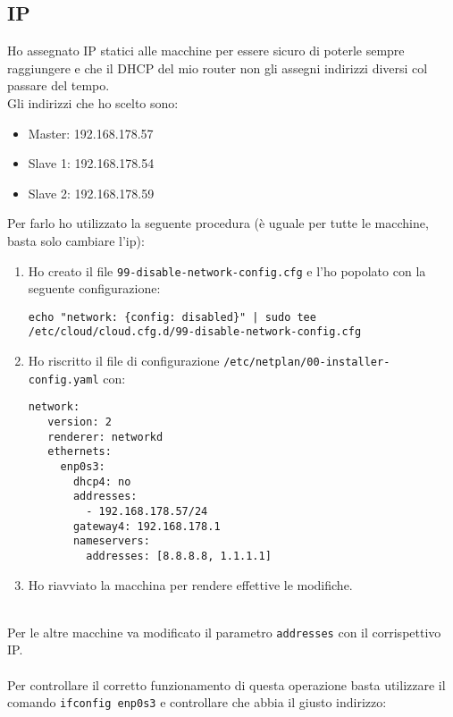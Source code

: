 \subsection{IP}

Ho assegnato IP statici alle macchine per essere sicuro di poterle sempre raggiungere e che
il DHCP del mio router non gli assegni indirizzi diversi col passare del tempo.\\
Gli indirizzi che ho scelto sono:
\begin{itemize}
	\item Master: 192.168.178.57
	\item Slave 1: 192.168.178.54
	\item Slave 2: 192.168.178.59
\end{itemize}
Per farlo ho utilizzato la seguente procedura (\`{e} uguale per tutte le macchine, basta solo cambiare l'ip):

\begin{enumerate}
	\item Ho creato il file \lstinline[style=cmd]|99-disable-network-config.cfg| e l'ho popolato con la seguente configurazione:
	
	\begin{lstlisting}[style=cmd]
 echo "network: {config: disabled}" | sudo tee /etc/cloud/cloud.cfg.d/99-disable-network-config.cfg
	\end{lstlisting}
	\item Ho riscritto il file di configurazione \lstinline[style=cmd]|/etc/netplan/00-installer-config.yaml| con:
	
	\begin{lstlisting}[style=cmd]
 network:
   version: 2
   renderer: networkd
   ethernets:
     enp0s3:
       dhcp4: no
       addresses:
         - 192.168.178.57/24
       gateway4: 192.168.178.1
       nameservers:
         addresses: [8.8.8.8, 1.1.1.1]
	\end{lstlisting}
	\item Ho riavviato la macchina per rendere effettive le modifiche.
\end{enumerate}
\ \\
Per le altre macchine va modificato il parametro \lstinline[style=cmd]|addresses| con il corrispettivo IP.\\
\ \\
Per controllare il corretto funzionamento di questa operazione basta utilizzare il comando \lstinline[style=cmd]|ifconfig enp0s3| e controllare che abbia il giusto indirizzo:

